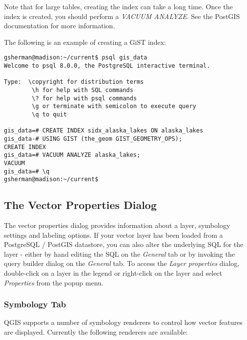 Note that for large tables, creating the index can take a long time. Once the
index is created, you should perform a \textit{VACUUM ANALYZE}. See the
PostGIS documentation \cite{PostGISweb} for more information.

The following is an example of creating a GiST index:
\begin{verbatim}
gsherman@madison:~/current$ psql gis_data
Welcome to psql 8.0.0, the PostgreSQL interactive terminal.

Type:  \copyright for distribution terms
        \h for help with SQL commands
        \? for help with psql commands
        \g or terminate with semicolon to execute query
        \q to quit

gis_data=# CREATE INDEX sidx_alaska_lakes ON alaska_lakes
gis_data-# USING GIST (the_geom GIST_GEOMETRY_OPS);
CREATE INDEX
gis_data=# VACUUM ANALYZE alaska_lakes;
VACUUM
gis_data=# \q
gsherman@madison:~/current$
\end{verbatim}

\subsection{The Vector Properties Dialog}\label{sec:vectorprops}

The vector properties dialog provides information about a layer, symbology
settings and labeling options. If your vector layer has been loaded from a
PostgreSQL / PostGIS datastore, you can also alter the underlying SQL for the
layer - either by hand editing the SQL on the \textit{General} tab or by
invoking the query builder dialog on the \textit{General} tab. To access the
\textit{Layer properties} dialog, double-click on a layer in the legend or right-click on the
layer and select \textit{Properties} from the popup menu.

\subsubsection{Symbology Tab}\label{sec:symbology}

QGIS supports a number of symbology renderers to control how
vector features are displayed. Currently the following renderers
are available:

